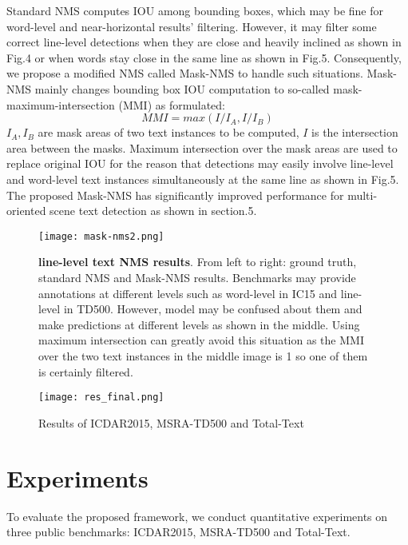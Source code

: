 \documentclass[a4paper,conference]{IEEEtran}
\begin{document}
Standard NMS computes IOU among bounding boxes, which may be fine for word-level and near-horizontal  results' filtering. However, it may filter some correct line-level detections when they are close and heavily inclined as shown in Fig.4 or when words stay close in the same line as shown in Fig.5. Consequently, we propose a modified NMS called Mask-NMS to handle such situations. Mask-NMS mainly changes bounding box IOU computation to so-called mask-maximum-intersection (MMI) as formulated:
\begin{equation}
    MMI =  max(I/I_{A}, I/I_{B})
\end{equation}
\begin{math}I_{A},I_{B}\end{math} are mask areas of two text instances to be computed,  \begin{math}I\end{math} is the intersection area between the masks. Maximum intersection over the mask areas are used to replace original IOU for the reason that detections may easily involve line-level and word-level text instances simultaneously at the same line as shown in Fig.5. 
The proposed Mask-NMS has significantly improved performance for multi-oriented scene text detection as shown in section.5. 
\begin{figure}[h]
\begin{center}
  
\texttt{[image: mask-nms2.png]}
\caption{\textbf{line-level text NMS results}. From left to right: ground truth, standard NMS  and Mask-NMS results. Benchmarks may provide annotations at different levels such as word-level in IC15 and line-level in TD500. However, model may be confused about them and make predictions at different levels as shown in the middle. Using maximum intersection can greatly avoid this situation as the MMI over the two text instances in the middle image is 1 so one of them is certainly filtered.} 

\end{center}
\end{figure}
\begin{figure*}
\begin{center}
  
\texttt{[image: res\_final.png]}
\caption{Results of ICDAR2015, MSRA-TD500 and Total-Text} 

\end{center}
\end{figure*} 
\section{Experiments}
To evaluate the proposed framework, we conduct quantitative experiments
on three public benchmarks: ICDAR2015, MSRA-TD500 and Total-Text.
\end{document}
